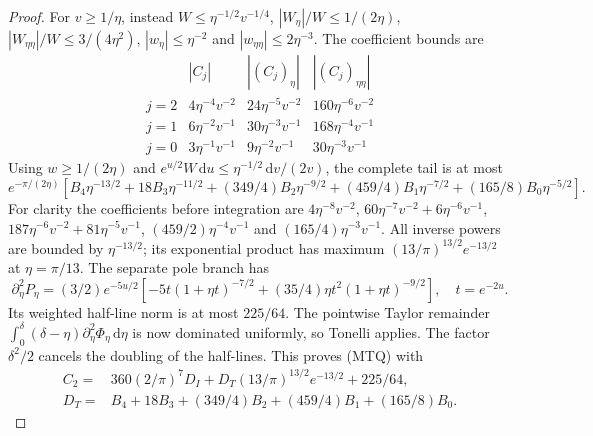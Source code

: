 \documentclass[11pt]{article}
\theoremstyle{remark}\newtheorem{remark}[theorem]{Remark}
\newcommand{\dd}{\,\mathrm d}
\begin{document}
\begin{proof}
For $v\ge1/\eta$, instead
$W\le\eta^{-1/2}v^{-1/4}$,
$|W_\eta|/W\le1/(2\eta)$, $|W_{\eta\eta}|/W\le3/(4\eta^2)$,
$|w_\eta|\le\eta^{-2}$ and $|w_{\eta\eta}|\le2\eta^{-3}$.
The coefficient bounds are
\[
 \begin{array}{c|ccc}
 &|C_j|&|(C_j)_\eta|&|(C_j)_{\eta\eta}|\\ \hline
 j=2&4\eta^{-4}v^{-2}&24\eta^{-5}v^{-2}&160\eta^{-6}v^{-2}\\
 j=1&6\eta^{-2}v^{-1}&30\eta^{-3}v^{-1}&168\eta^{-4}v^{-1}\\
 j=0&3\eta^{-1}v^{-1}&9\eta^{-2}v^{-1}&30\eta^{-3}v^{-1}
 \end{array}
\]
Using $w\ge1/(2\eta)$ and
$e^{u/2}W\dd u\le\eta^{-1/2}\dd v/(2v)$, the complete tail is at most
\[
 e^{-\pi/(2\eta)}
 [B_4\eta^{-13/2}+18B_3\eta^{-11/2}
 +(349/4)B_2\eta^{-9/2}+(459/4)B_1\eta^{-7/2}
                                      +(165/8)B_0\eta^{-5/2}].
\]
For clarity the coefficients before integration are
$4\eta^{-8}v^{-2}$,
$60\eta^{-7}v^{-2}+6\eta^{-6}v^{-1}$,
$187\eta^{-6}v^{-2}+81\eta^{-5}v^{-1}$,
$(459/2)\eta^{-4}v^{-1}$ and $(165/4)\eta^{-3}v^{-1}$.
All inverse powers are bounded by $\eta^{-13/2}$; its exponential
product has maximum $(13/\pi)^{13/2}e^{-13/2}$ at $\eta=\pi/13$.
The separate pole branch has
\[
 \partial_\eta^2P_\eta=(3/2)e^{-5u/2}
 [-5t(1+\eta t)^{-7/2}+(35/4)\eta t^2(1+\eta t)^{-9/2}],
 \quad t=e^{-2u}.
\]
Its weighted half-line norm is at most $225/64$.
The pointwise Taylor remainder
$\int_0^\delta(\delta-\eta)\partial_\eta^2\Phi_\eta\dd\eta$
is now dominated uniformly, so Tonelli applies. The factor
$\delta^2/2$ cancels the doubling of the half-lines. This proves
(MTQ) with
\[
\begin{split}
 C_2={}&360(2/\pi)^7D_I+
             D_T(13/\pi)^{13/2}e^{-13/2}+225/64,\\
 D_T={}&B_4+18B_3+(349/4)B_2+(459/4)B_1+(165/8)B_0 .
\end{split}
\]


\end{proof}
\end{document}
